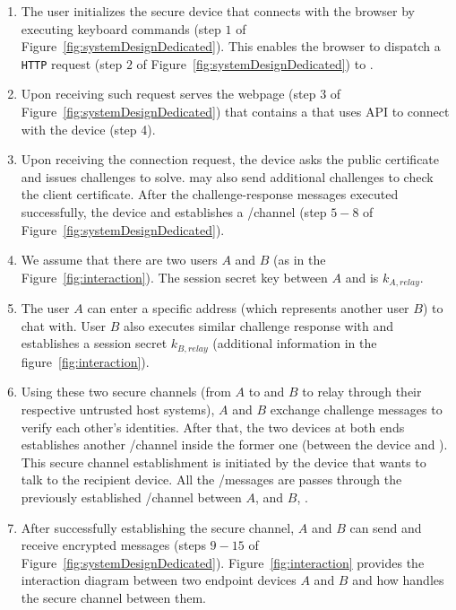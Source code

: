 \begin{enumerate}

\item The user initializes the secure \usb device that connects with the browser by executing keyboard commands (step $1$ of Figure~\ref{fig:systemDesignDedicated}). This enables the browser to dispatch a \texttt{HTTP} request (step $2$ of Figure~\ref{fig:systemDesignDedicated}) to \relay.
  
\item Upon receiving such request \relay serves the webpage (step $3$ of Figure~\ref{fig:systemDesignDedicated}) that contains a \js that uses \webusb API to connect with the \usb device (step 4).

\item Upon receiving the connection request, the \usb device asks \relay the public certificate and issues challenges to solve. \relay may also send additional challenges to check the client certificate. After the challenge-response messages executed successfully, the device and \relay establishes a \ssl/\tls channel (step $5-8$ of Figure~\ref{fig:systemDesignDedicated}). 

\item We assume that there are two users $A$ and $B$ (as in the Figure~\ref{fig:interaction}). The session secret key between $A$ and \relay is $k_{A, relay}$. 

\item The user $A$ can enter a specific address (which represents another user $B$) to chat with. User $B$ also executes similar challenge response with \relay and establishes a session secret $k_{B, relay}$ (additional information in the figure~\ref{fig:interaction}). 

\item Using these two secure channels (from $A$ to \relay and $B$ to relay through their respective untrusted host systems), $A$ and $B$ exchange challenge messages to verify each other's identities. After that, the two devices at both ends establishes another \ssl/\tls channel inside the former one (between the device and \relay). This secure channel establishment is initiated by the device that wants to talk to the recipient device. All the \ssl/\tls messages are passes through the previously established \ssl/\tls channel between $A$, \relay and $B$, \relay. 

\item After successfully establishing the secure channel, $A$ and $B$ can send and receive encrypted messages (steps $9-15$ of Figure~\ref{fig:systemDesignDedicated}). Figure~\ref{fig:interaction} provides the interaction diagram between two endpoint devices $A$ and $B$ and how \relay handles the secure channel between them.

\end{enumerate}

